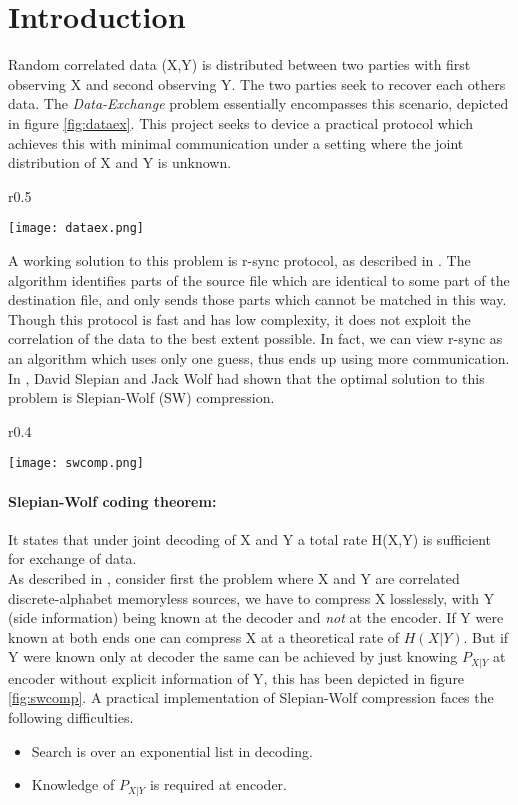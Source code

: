 \documentclass[
11pt, %
a4paper, %
oneside, %
headinclude,footinclude, %
BCOR5mm, %
]{scrartcl}
\begin{document}
\section{Introduction}\label{intro}
Random correlated data (X,Y) is distributed between two parties with first observing X and second observing Y. The two parties seek to recover each others data. The \emph{Data-Exchange} problem essentially encompasses this scenario,  depicted in figure \ref{fig:dataex}. This project seeks to device a practical protocol which achieves this with minimal communication under a setting where the joint distribution of X and Y is unknown.\\
\begin{wrapfigure}{r}{0.5\textwidth}
  \begin{center}
    \texttt{[image: dataex.png]}
  \end{center}
  \caption{The Data-Exchange problem}
  \label{fig:dataex}
\end{wrapfigure}
A working solution to this problem is r-sync protocol, as described in   \cite{rsync}. The algorithm identifies parts of the source file which are identical to some part of the destination file, and only sends those parts which cannot be matched in this way. Though this protocol is fast and has low complexity, it does not exploit the correlation of the data to the best extent possible. In fact, we can view r-sync as an algorithm which uses only one guess,  thus ends up using more communication.\\
In \cite{sw}, David Slepian and Jack Wolf had shown that the optimal solution to this problem is Slepian-Wolf (SW) compression. 
\begin{wrapfigure}{r}{0.4\textwidth}
  \begin{center}
    \texttt{[image: swcomp.png]}
  \end{center}
  \caption{The Slepian-Wolf compression}
  \label{fig:swcomp}
\end{wrapfigure}
\paragraph{Slepian-Wolf coding theorem:}It states that under joint decoding of X and Y a total rate H(X,Y) is sufficient for exchange of data.\\
As described in \cite{discus}, consider first the problem where X and Y are correlated discrete-alphabet memoryless sources, we have to compress X losslessly, with Y (side information) being known at the decoder and \emph{not} at the encoder. If Y were known at both ends one can compress X at a theoretical rate of $H(X|Y)$. But if Y were known only at decoder the same can be achieved by just knowing $P_{X|Y}$ at encoder without explicit information of Y, this has been depicted in figure \ref{fig:swcomp}. 
\clearpage
A practical implementation of Slepian-Wolf compression faces the following difficulties.
\begin{itemize}
\item Search is over an exponential list in decoding.
\item Knowledge of $P_{X|Y}$ is required at encoder.
\end{itemize} 
\end{document}
